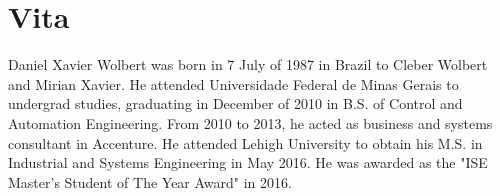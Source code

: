 \chapter*{Vita}

Daniel Xavier Wolbert was born in 7 July of 1987 in Brazil to Cleber Wolbert and Mirian Xavier. He attended Universidade Federal de Minas Gerais to undergrad studies, graduating in December of 2010 in B.S. of Control and Automation Engineering. From 2010 to 2013, he acted as business and systems consultant in Accenture. He attended Lehigh University to obtain his M.S. in Industrial and Systems Engineering in May 2016. He was awarded as the "ISE Master's Student of The Year Award" in 2016.